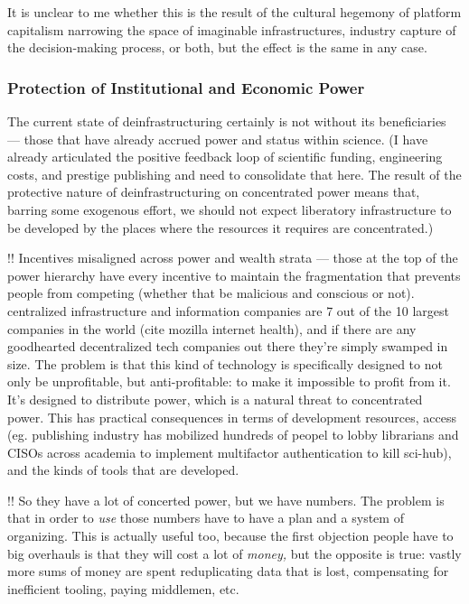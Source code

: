 \documentclass[10pt]{article}
\begin{document}
\begin{multicols}{2}
It is unclear to me whether this is the result of the cultural hegemony
of platform capitalism narrowing the space of imaginable
infrastructures, industry capture of the decision-making process, or
both, but the effect is the same in any case.

\hypertarget{protection-of-institutional-and-economic-power}{%
\subsubsection{Protection of Institutional and Economic
Power}\label{protection-of-institutional-and-economic-power}}

The current state of deinfrastructuring certainly is not without its
beneficiaries --- those that have already accrued power and status
within science. (I have already articulated the positive feedback loop
of scientific funding, engineering costs, and prestige publishing and
need to consolidate that here. The result of the protective nature of
deinfrastructuring on concentrated power means that, barring some
exogenous effort, we should not expect liberatory infrastructure to be
developed by the places where the resources it requires are
concentrated.)

!! Incentives misaligned across power and wealth strata --- those at the
top of the power hierarchy have every incentive to maintain the
fragmentation that prevents people from competing (whether that be
malicious and conscious or not). centralized infrastructure and
information companies are 7 out of the 10 largest companies in the world
(cite mozilla internet health), and if there are any goodhearted
decentralized tech companies out there they're simply swamped in size.
The problem is that this kind of technology is specifically designed to
not only be unprofitable, but anti-profitable: to make it impossible to
profit from it. It's designed to distribute power, which is a natural
threat to concentrated power. This has practical consequences in terms
of development resources, access (eg. publishing industry has mobilized
hundreds of peopel to lobby librarians and CISOs across academia to
implement multifactor authentication to kill sci-hub), and the kinds of
tools that are developed.

!! So they have a lot of concerted power, but we have numbers. The
problem is that in order to \emph{use} those numbers have to have a plan
and a system of organizing. This is actually useful too, because the
first objection people have to big overhauls is that they will cost a
lot of \emph{money,} but the opposite is true: vastly more sums of money
are spent reduplicating data that is lost, compensating for inefficient
tooling, paying middlemen, etc. 
\end{multicols}
\end{document}
